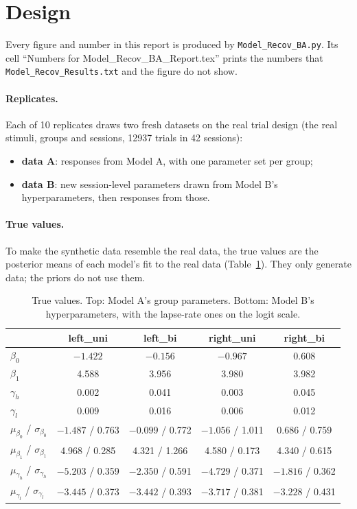 \documentclass[11pt]{article}
\newcommand{\code}[1]{\texttt{#1}}
\begin{document}
\section{Design}

Every figure and number in this report is produced by \code{Model\_Recov\_BA.py}. Its
cell ``Numbers for Model\_Recov\_BA\_Report.tex'' prints the numbers that
\code{Model\_Recov\_Results.txt} and the figure do not show.

\paragraph{Replicates.} Each of 10 replicates draws two fresh datasets on the real
trial design (the real stimuli, groups and sessions, 12937 trials in 42 sessions):
\begin{itemize}
  \item \textbf{data A}: responses from Model A, with one parameter set per group;
  \item \textbf{data B}: new session-level parameters drawn from Model B's
        hyperparameters, then responses from those.
\end{itemize}

\paragraph{True values.} To make the synthetic data resemble the real data, the true
values are the posterior means of each model's fit to the real data
(Table~\ref{tab:true}). They only generate data; the priors do not use them.

\begin{table}[H]
\centering
\caption{True values. Top: Model A's group parameters. Bottom: Model B's
hyperparameters, with the lapse-rate ones on the logit scale.}
\label{tab:true}
\begin{tabular}{lcccc}
\toprule
 & left\_uni & left\_bi & right\_uni & right\_bi \\
\midrule
$\beta_0$ & $-1.422$ & $-0.156$ & $-0.967$ & 0.608 \\
$\beta_1$ & 4.588 & 3.956 & 3.980 & 3.982 \\
$\gamma_h$ & 0.002 & 0.041 & 0.003 & 0.045 \\
$\gamma_l$ & 0.009 & 0.016 & 0.006 & 0.012 \\
\midrule
$\mu_{\beta_0}$ / $\sigma_{\beta_0}$ & $-1.487$ / 0.763 & $-0.099$ / 0.772 & $-1.056$ / 1.011 & 0.686 / 0.759 \\
$\mu_{\beta_1}$ / $\sigma_{\beta_1}$ & 4.968 / 0.285 & 4.321 / 1.266 & 4.580 / 0.173 & 4.340 / 0.615 \\
$\mu_{\gamma_h}$ / $\sigma_{\gamma_h}$ & $-5.203$ / 0.359 & $-2.350$ / 0.591 & $-4.729$ / 0.371 & $-1.816$ / 0.362 \\
$\mu_{\gamma_l}$ / $\sigma_{\gamma_l}$ & $-3.445$ / 0.373 & $-3.442$ / 0.393 & $-3.717$ / 0.381 & $-3.228$ / 0.431 \\
\bottomrule
\end{tabular}
\end{table}
\end{document}
